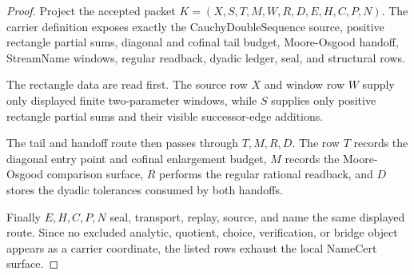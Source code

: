 \begin{proof}
Project the accepted packet $K=(X,S,T,M,W,R,D,E,H,C,P,N)$. The carrier definition exposes exactly the CauchyDoubleSequence source, positive rectangle partial sums, diagonal and cofinal tail budget, Moore-Osgood handoff, StreamName windows, regular readback, dyadic ledger, seal, and structural rows.

The rectangle data are read first. The source row $X$ and window row $W$ supply only displayed finite two-parameter windows, while $S$ supplies only positive rectangle partial sums and their visible successor-edge additions.

The tail and handoff route then passes through $T,M,R,D$. The row $T$ records the diagonal entry point and cofinal enlargement budget, $M$ records the Moore-Osgood comparison surface, $R$ performs the regular rational readback, and $D$ stores the dyadic tolerances consumed by both handoffs.

Finally $E,H,C,P,N$ seal, transport, replay, source, and name the same displayed route. Since no excluded analytic, quotient, choice, verification, or bridge object appears as a carrier coordinate, the listed rows exhaust the local NameCert surface.
\end{proof}

